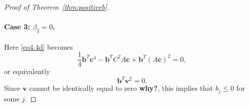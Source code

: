 \begin{proof}[Proof of Theorem~\ref{thm:positiveb}]
    \paragraph{Case 3: \( \beta_2 = 0 \).}
    Here \eqref{eq4.4d} becomes
    \begin{equation*}
        \frac{1}{4}\bm{b}^{T}\bm{c}^{4} - \bm{b}^{T}C^{2}A\bm{c} + \bm{b}^{T}(A\bm{c})^{2} = 0,
    \end{equation*}
    or equivalently
    \begin{equation*}
        \bm{b}^{T}\bm{v}^{2} = 0.
    \end{equation*}
    Since \( \bm{v} \) cannot be identically equal to zero {\bf why?}, this implies that $b_j\le0$ for some $j$.
\end{proof}
